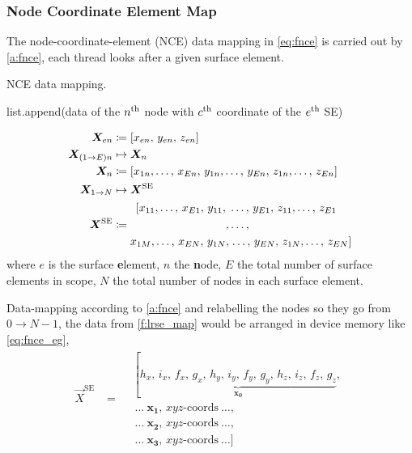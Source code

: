 \subsubsection{Node Coordinate Element Map}
%
The node-coordinate-element (NCE) data mapping in \cref{eq:fnce} is carried out by \cref{a:fnce}, each thread looks after a given surface element.
\begin{algorithm}
	\caption{NCE data mapping.}
	\label{a:fnce}
	\begin{algorithmic}
		\State list.append(data of the $ n\textsuperscript{th}$ node with $ c\textsuperscript{th} $ coordinate of the $ e\textsuperscript{th} $ SE)
		\EndFor
		\EndFor
		\EndFor
	\end{algorithmic}
\end{algorithm}
\begin{subequations}\label{eq:fnce}
	\begin{align}
		\vec{X}_{en}          & \coloneqq \left[x_{en},\, y_{en},\, z_{en}\right]                                                    \\
		\vec{X}_{(1\to E)n}   & \mapsto \vec{X}_{n} \nn
		\vec{X}_{n}           & \coloneqq \left[x_{1n},\ldots,\, x_{En},\, y_{1n},\ldots,\, y_{En},\, z_{1n},\ldots,\, z_{En}\right] \\
		\vec{X}_{1\to N}      & \mapsto \vec{X}^{\textrm{SE}}\nn
		\vec{X}^{\textrm{SE}} & \coloneqq
		\begin{aligned}
			\left[x_{11},\ldots,\, x_{E1},\, y_{11},\right. & \ldots,\, y_{E1},\, z_{11},\ldots,\, z_{E1}              \\
			,                                               & \ldots,                                                  \\
			x_{1M},\ldots,\, x_{EN},\, y_{1N},              & \left.\ldots,\, y_{EN},\, z_{1N},\ldots,\, z_{EN}\right]
		\end{aligned}
	\end{align}
\end{subequations}
where $ e $ is the surface \textbf{e}lement, $ n $ the \textbf{n}ode, $ E $ the total number of surface elements in scope, $ N $ the total number of nodes in each surface element.

Data-mapping according to \cref{a:fnce} and relabelling the nodes so they go from $ 0 \to N-1 $, the data from \cref{f:lrse_map} would be arranged in device memory like \cref{eq:fnce_eg},
\begin{align}\label{eq:fnce_eg}
	\vec{X}^{\textrm{SE}} & = \begin{aligned}
		 & \left[\underbrace{h_{x},\, i_{x},\, f_{x},\, g_{x},\,
			h_{y},\, i_{y},\, f_{y},\, g_{y},\,
		h_{z},\, i_{z},\, f_{z},\, g_{z}}_{\mathbf{x_{0}}}\right., \\
		 & ~\ldots~\mathbf{x_{1}},\, xyz\textrm{-coords}~\ldots,   \\
		 & ~\ldots~\mathbf{x_{2}},\, xyz\textrm{-coords}~\ldots,   \\
		 & ~\ldots~\mathbf{x_{3}},\, xyz\textrm{-coords}~\ldots]
	\end{aligned}
\end{align}
%
